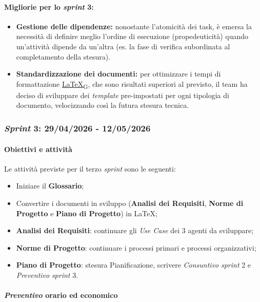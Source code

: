 \documentclass[12pt, a4paper]{article}
\newcommand{\urlglossario}{https://skynetunigroup.github.io/Code_Guardian/Documentazione/RTB/glossario_v1.0.0.pdf} %
\newcommand{\glo}[2]{\href{\urlglossario\#nameddest=#2}{#1\textsubscript{G}}}
\begin{document}
{\paragraph{Migliorie per lo \textit{sprint} 3:}
\begin{itemize}
    \item \textbf{Gestione delle dipendenze:} nonostante l'atomicità dei task, è emersa la necessità di definire meglio l'ordine di esecuzione (propedeuticità) quando un'attività dipende da un'altra (es. la fase di verifica subordinata al completamento della stesura).
    \item \textbf{Standardizzazione dei documenti:} per ottimizzare i tempi di formattazione {\glo{\LaTeX{}}{latex}}, che sono risultati superiori al previsto, il team ha deciso di sviluppare dei \textit{template} pre-impostati per ogni tipologia di documento, velocizzando così la futura stesura tecnica.
\end{itemize}

\subsubsection{\textit{Sprint} 3: 29/04/2026 - 12/05/2026}

\paragraph{Obiettivi e attività}

Le attività previste per il terzo \textit{sprint} sono le seguenti:

\begin{itemize}
\item
    Iniziare il \textbf{Glossario};
\item
  Convertire i documenti in sviluppo (\textbf{Analisi dei Requisiti}, \textbf{Norme di Progetto} e \textbf{Piano di Progetto}) in \LaTeX{};
\item
  \textbf{Analisi dei Requisiti}: continuare gli \textit{Use Case} dei 3
  agenti da sviluppare;
\item
  \textbf{Norme di Progetto}: continuare i processi primari e processi
  organizzativi;
\item
  \textbf{Piano di Progetto}: stesura Pianificazione, scrivere \textit{Consuntivo} \textit{sprint} 2 e \textit{Preventivo} \textit{sprint} 3.
\end{itemize}


\paragraph{\textit{Preventivo} orario ed economico}

}
\end{document}
